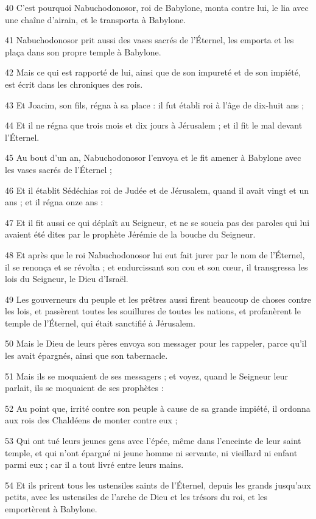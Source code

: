 \par 40 C'est pourquoi Nabuchodonosor, roi de Babylone, monta contre lui, le lia avec une chaîne d'airain, et le transporta à Babylone.
\par 41 Nabuchodonosor prit aussi des vases sacrés de l'Éternel, les emporta et les plaça dans son propre temple à Babylone.
\par 42 Mais ce qui est rapporté de lui, ainsi que de son impureté et de son impiété, est écrit dans les chroniques des rois.
\par 43 Et Joacim, son fils, régna à sa place : il fut établi roi à l'âge de dix-huit ans ;
\par 44 Et il ne régna que trois mois et dix jours à Jérusalem ; et il fit le mal devant l'Éternel.
\par 45 Au bout d'un an, Nabuchodonosor l'envoya et le fit amener à Babylone avec les vases sacrés de l'Éternel ;
\par 46 Et il établit Sédéchias roi de Judée et de Jérusalem, quand il avait vingt et un ans ; et il régna onze ans :
\par 47 Et il fit aussi ce qui déplaît au Seigneur, et ne se soucia pas des paroles qui lui avaient été dites par le prophète Jérémie de la bouche du Seigneur.
\par 48 Et après que le roi Nabuchodonosor lui eut fait jurer par le nom de l'Éternel, il se renonça et se révolta ; et endurcissant son cou et son cœur, il transgressa les lois du Seigneur, le Dieu d'Israël.
\par 49 Les gouverneurs du peuple et les prêtres aussi firent beaucoup de choses contre les lois, et passèrent toutes les souillures de toutes les nations, et profanèrent le temple de l'Éternel, qui était sanctifié à Jérusalem.
\par 50 Mais le Dieu de leurs pères envoya son messager pour les rappeler, parce qu'il les avait épargnés, ainsi que son tabernacle.
\par 51 Mais ils se moquaient de ses messagers ; et voyez, quand le Seigneur leur parlait, ils se moquaient de ses prophètes :
\par 52 Au point que, irrité contre son peuple à cause de sa grande impiété, il ordonna aux rois des Chaldéens de monter contre eux ;
\par 53 Qui ont tué leurs jeunes gens avec l'épée, même dans l'enceinte de leur saint temple, et qui n'ont épargné ni jeune homme ni servante, ni vieillard ni enfant parmi eux ; car il a tout livré entre leurs mains.
\par 54 Et ils prirent tous les ustensiles saints de l'Éternel, depuis les grands jusqu'aux petits, avec les ustensiles de l'arche de Dieu et les trésors du roi, et les emportèrent à Babylone.
